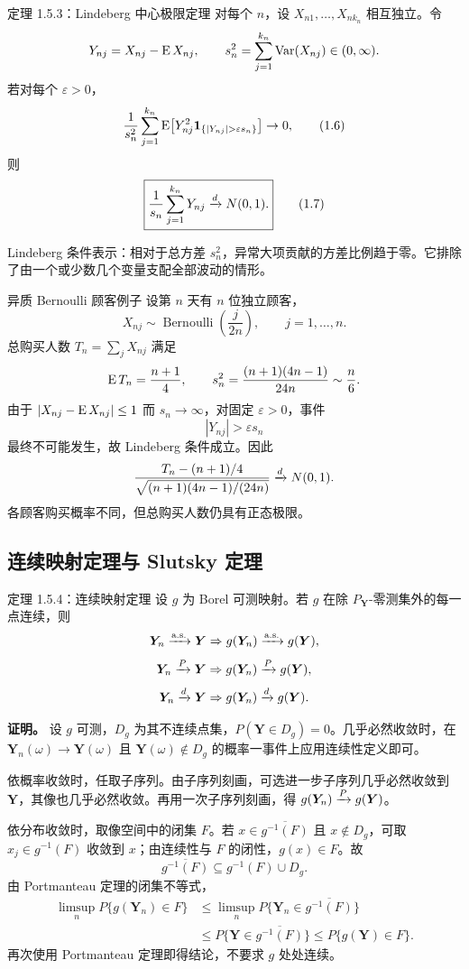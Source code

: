\begin{definitionbox}{定理 1.5.3：Lindeberg 中心极限定理}
对每个 $n$，设 $X_{n1},\ldots,X_{nk_n}$ 相互独立。令
\[
 Y_{nj}=X_{nj}-\operatorname{E} X_{nj},
 \qquad
 s_n^2=\sum_{j=1}^{k_n}\operatorname{Var}(X_{nj})\in(0,\infty).
\]
若对每个 $\varepsilon>0$，
\[
 \frac1{s_n^2}\sum_{j=1}^{k_n}
 \E\!\left[Y_{nj}^2
 \ind_{\{|Y_{nj}|>\varepsilon s_n\}}\right]
 \to0,
 \tag{1.6}
\]
则
\[
 \boxed{
 \frac1{s_n}\sum_{j=1}^{k_n}Y_{nj}\xrightarrow{d} N(0,1).}
 \tag{1.7}
\]
\end{definitionbox}

Lindeberg 条件表示：相对于总方差 $s_n^2$，异常大项贡献的方差比例趋于零。它排除了由一个或少数几个变量支配全部波动的情形。

\begin{examplebox}{异质 Bernoulli 顾客例子}
设第 $n$ 天有 $n$ 位独立顾客，
\[
 X_{nj}\sim\operatorname{Bernoulli}\!\left(\frac{j}{2n}\right),
 \qquad j=1,\ldots,n.
\]
总购买人数 $T_n=\sum_jX_{nj}$ 满足
\[
 \operatorname{E} T_n=\frac{n+1}{4},
 \qquad
 s_n^2=\frac{(n+1)(4n-1)}{24n}\sim\frac n6.
\]
由于 $|X_{nj}-\operatorname{E} X_{nj}|\leq1$ 而 $s_n\to\infty$，对固定 $\varepsilon>0$，事件
\[
 |Y_{nj}|>\varepsilon s_n
\]
最终不可能发生，故 Lindeberg 条件成立。因此
\[
 \frac{T_n-(n+1)/4}{\sqrt{(n+1)(4n-1)/(24n)}}
 \xrightarrow{d} N(0,1).
\]
各顾客购买概率不同，但总购买人数仍具有正态极限。
\end{examplebox}

\subsection{连续映射定理与 Slutsky 定理}

\begin{definitionbox}{定理 1.5.4：连续映射定理}
设 $g$ 为 Borel 可测映射。若 $g$ 在除 $P_{\bm Y}$-零测集外的每一点连续，则
\[
 \bm Y_n\xrightarrow{\mathrm{a.s.}}\bm Y\Rightarrow g(\bm Y_n)\xrightarrow{\mathrm{a.s.}} g(\bm Y),
\]
\[
 \bm Y_n\xrightarrow{P}\bm Y\Rightarrow g(\bm Y_n)\xrightarrow{P} g(\bm Y),
\]
\[
 \bm Y_n\xrightarrow{d}\bm Y\Rightarrow g(\bm Y_n)\xrightarrow{d} g(\bm Y).
\]
\end{definitionbox}

\textbf{证明。} 设 $g$ 可测，$D_g$ 为其不连续点集，$P(\bm Y\in D_g)=0$。几乎必然收敛时，在 $\bm Y_n(\omega)\to\bm Y(\omega)$ 且 $\bm Y(\omega)\notin D_g$ 的概率一事件上应用连续性定义即可。

依概率收敛时，任取子序列。由子序列刻画，可选进一步子序列几乎必然收敛到 $\bm Y$，其像也几乎必然收敛。再用一次子序列刻画，得 $g(\bm Y_n)\xrightarrow{P} g(\bm Y)$。

依分布收敛时，取像空间中的闭集 $F$。若 $x\in\overline{g^{-1}(F)}$ 且 $x\notin D_g$，可取 $x_j\in g^{-1}(F)$ 收敛到 $x$；由连续性与 $F$ 的闭性，$g(x)\in F$。故
\[
 \overline{g^{-1}(F)}\subseteq g^{-1}(F)\cup D_g.
\]
由 Portmanteau 定理的闭集不等式，
\[
\begin{aligned}
 \limsup_n P\{g(\bm Y_n)\in F\}
 &\le\limsup_n P\{\bm Y_n\in\overline{g^{-1}(F)}\}\\
 &\le P\{\bm Y\in\overline{g^{-1}(F)}\}
 \le P\{g(\bm Y)\in F\}.
\end{aligned}
\]
再次使用 Portmanteau 定理即得结论，不要求 $g$ 处处连续。

